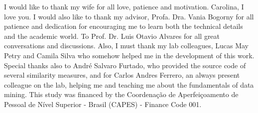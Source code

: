 
\begin{agradecimentos}

\lang
{
    I would like to thank my wife for all love, patience and motivation. Carolina, I love you.
    I would also like to thank my advisor, Profa. Dra. Vania Bogorny for all patience and dedication for encouraging me to learn both the technical details and the academic world. To Prof. Dr. Luis Otavio Alvares for all great conversations and discussions.
    Also, I must thank my lab colleagues, Lucas May Petry and Camila Silva who somehow helped me in the development of this work. Special thanks also to Andr\'e Salvaro Furtado, who provided the source code of several similarity measures, and for Carlos Andres Ferrero, an always present colleague on the lab, helping me and teaching me about the fundamentals of data mining.
    This study was financed by the Coordenação de Aperfeiçoamento de Pessoal de Nível Superior - Brasil (CAPES) - Finance Code 001.
}
{
    
}

\end{agradecimentos}


%
%
%

